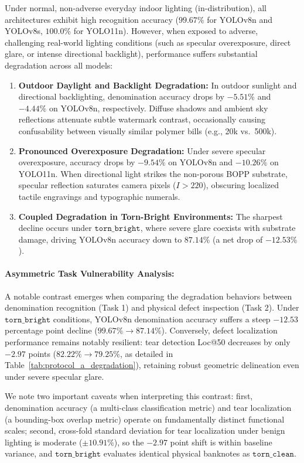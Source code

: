 \documentclass[final,5p,times,twocolumn,authoryear]{elsarticle}
\begin{document}
Under normal, non-adverse everyday indoor lighting (in-distribution), all architectures exhibit high recognition accuracy ($99.67\%$ for YOLOv8n and YOLOv8s, $100.0\%$ for YOLO11n). However, when exposed to adverse, challenging real-world lighting conditions (such as specular overexposure, direct glare, or intense directional backlight), performance suffers substantial degradation across all models:
\begin{enumerate}[label=(\roman*)]
    \item \textbf{Outdoor Daylight and Backlight Degradation:} In outdoor sunlight and directional backlighting, denomination accuracy drops by $-5.51\%$ and $-4.44\%$ on YOLOv8n, respectively. Diffuse shadows and ambient sky reflections attenuate subtle watermark contrast, occasionally causing confusability between visually similar polymer bills (e.g., 20k vs.\ 500k).
    \item \textbf{Pronounced Overexposure Degradation:} Under severe specular overexposure, accuracy drops by $-9.54\%$ on YOLOv8n and $-10.26\%$ on YOLO11n. When directional light strikes the non-porous BOPP substrate, specular reflection saturates camera pixels ($I > 220$), obscuring localized tactile engravings and typographic numerals.
    \item \textbf{Coupled Degradation in Torn-Bright Environments:} The sharpest decline occurs under $\texttt{torn\_bright}$, where severe glare coexists with substrate damage, driving YOLOv8n accuracy down to $87.14\%$ (a net drop of $-12.53\%$).
\end{enumerate}

\paragraph{Asymmetric Task Vulnerability Analysis:}
A notable contrast emerges when comparing the degradation behaviors between denomination recognition (Task 1) and physical defect inspection (Task 2). Under $\texttt{torn\_bright}$ conditions, YOLOv8n denomination accuracy suffers a steep $-12.53$ percentage point decline ($99.67\% \to 87.14\%$). Conversely, defect localization performance remains notably resilient: tear detection Loc@50 decreases by only $-2.97$ points ($82.22\% \to 79.25\%$, as detailed in Table~\ref{tab:protocol_a_degradation}), retaining robust geometric delineation even under severe specular glare.

We note two important caveats when interpreting this contrast: first, denomination accuracy (a multi-class classification metric) and tear localization (a bounding-box overlap metric) operate on fundamentally distinct functional scales; second, cross-fold standard deviation for tear localization under benign lighting is moderate ($\pm 10.91\%$), so the $-2.97$ point shift is within baseline variance, and $\texttt{torn\_bright}$ evaluates identical physical banknotes as $\texttt{torn\_clean}$.
\end{document}

